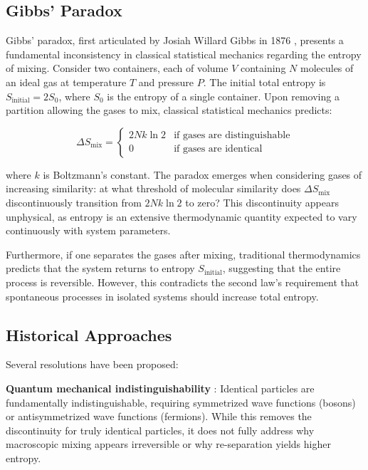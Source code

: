 \documentclass[12pt,a4paper]{article}
\theoremstyle{remark}
\begin{document}
\subsection{Gibbs' Paradox}

Gibbs' paradox, first articulated by Josiah Willard Gibbs in 1876 \cite{gibbs1876equilibrium}, presents a fundamental inconsistency in classical statistical mechanics regarding the entropy of mixing. Consider two containers, each of volume $V$ containing $N$ molecules of an ideal gas at temperature $T$ and pressure $P$. The initial total entropy is $S_\text{initial} = 2S_0$, where $S_0$ is the entropy of a single container. Upon removing a partition allowing the gases to mix, classical statistical mechanics predicts:

\begin{equation}
\Delta S_\text{mix} = 
\begin{cases}
2Nk \ln 2 & \text{if gases are distinguishable} \\
0 & \text{if gases are identical}
\end{cases}
\label{eq:gibbs_standard}
\end{equation}

where $k$ is Boltzmann's constant. The paradox emerges when considering gases of increasing similarity: at what threshold of molecular similarity does $\Delta S_\text{mix}$ discontinuously transition from $2Nk \ln 2$ to zero? This discontinuity appears unphysical, as entropy is an extensive thermodynamic quantity expected to vary continuously with system parameters.

Furthermore, if one separates the gases after mixing, traditional thermodynamics predicts that the system returns to entropy $S_\text{initial}$, suggesting that the entire process is reversible. However, this contradicts the second law's requirement that spontaneous processes in isolated systems should increase total entropy.

\subsection{Historical Approaches}

Several resolutions have been proposed:

\textbf{Quantum mechanical indistinguishability} \cite{bach1997gibbs,saunders2006gibbs}: Identical particles are fundamentally indistinguishable, requiring symmetrized wave functions (bosons) or antisymmetrized wave functions (fermions). While this removes the discontinuity for truly identical particles, it does not fully address why macroscopic mixing appears irreversible or why re-separation yields higher entropy.
\end{document}
